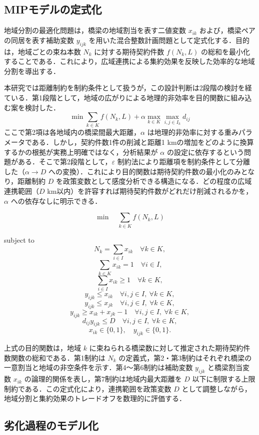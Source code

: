 \documentclass[Journal,letterpaper,InsideFigs,NoLineNumbers]{ascelike-new}
\begin{document}
\subsection{MIPモデルの定式化}

地域分割の最適化問題は，橋梁の地域割当を表す二値変数 \(x_{ik}\) および，橋梁ペアの同居を表す補助変数 \(y_{ijk}\) を用いた混合整数計画問題として定式化する．目的は，地域ごとの束ね本数 \(N_k\) に対する期待契約件数 \(f(N_k,L)\) の総和を最小化することである．これにより，広域連携による集約効果を反映した効率的な地域分割を導出する．

本研究では距離制約を制約条件として扱うが，この設計判断は2段階の検討を経ている．第1段階として，地域の広がりによる地理的非効率を目的関数に組み込む案を検討した．
\[
\min \sum_{k \in K} f(N_k,L) + \alpha \max_{k \in K} \max_{i,j \in I_k} d_{ij}
\]
ここで第2項は各地域内の橋梁間最大距離，\(\alpha\) は地理的非効率に対する重みパラメータである．しかし，契約件数1件の削減と距離1 kmの増加をどのように換算するかの根拠が実務上明確ではなく，分析結果が \(\alpha\) の設定に依存するという問題がある．そこで第2段階として，\(\varepsilon\) 制約法により距離項を制約条件として分離した（\(\alpha \to D\) への変換）．これにより目的関数は期待契約件数の最小化のみとなり，距離制約 \(D\) を政策変数として感度分析できる構造になる．どの程度の広域連携範囲（\(D\) km以内）を許容すれば期待契約件数がどれだけ削減されるかを，\(\alpha\) への依存なしに明示できる．

\[
\min \quad \sum_{k\in K} f(N_k,L)
\]

subject to
\[
N_k = \sum_{i\in I} x_{ik}
\quad \forall k\in K,
\]
\[
\sum_{k\in K} x_{ik} = 1
\quad \forall i\in I,
\]
\[
\sum_{i\in I} x_{ik} \geq 1
\quad \forall k\in K,
\]
\[
y_{ijk} \leq x_{ik}
\quad \forall i,j\in I,\ \forall k\in K,
\]
\[
y_{ijk} \leq x_{jk}
\quad \forall i,j\in I,\ \forall k\in K,
\]
\[
y_{ijk} \geq x_{ik}+x_{jk}-1
\quad \forall i,j\in I,\ \forall k\in K,
\]
\[
d_{ij}y_{ijk} \leq D
\quad \forall i,j\in I,\ \forall k\in K,
\]
\[
x_{ik}\in\{0,1\},\quad y_{ijk}\in\{0,1\}.
\]

上式の目的関数は，地域 \(k\) に束ねられる橋梁数に対して推定された期待契約件数関数の総和である．第1制約は \(N_k\) の定義式，第2・第3制約はそれぞれ橋梁の一意割当と地域の非空条件を示す．第4～第6制約は補助変数 \(y_{ijk}\) と橋梁割当変数 \(x_{ik}\) の論理的関係を表し，第7制約は地域内最大距離を \(D\) 以下に制限する上限制約である．この定式化により，連携範囲を政策変数 \(D\) として調整しながら，地域分割と集約効果のトレードオフを数理的に評価する．

\subsection{劣化過程のモデル化}
\end{document}
